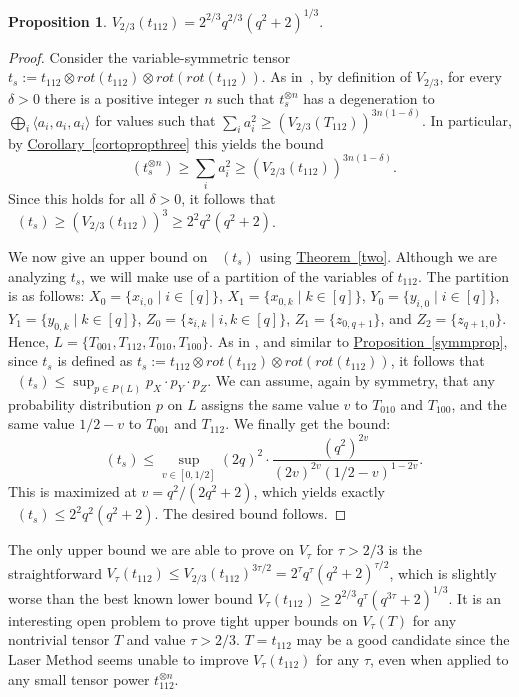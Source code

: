 \documentclass[11pt]{article}
\numberwithin{equation}{section}
\newtheorem{proposition}[theorem]{Proposition}
\theoremstyle{definition}
\theoremstyle{plain}
\newcommand{\expref}[2]{\hyperref[#2]{#1~\ref{#2}}}
\newcommand{\tsr}{\mathop{\tilde{\operatorname{S}}}}
\theoremstyle{definition}
\begin{document}
\begin{proposition} \label{valueprop}
$V_{2/3}(t_{112}) = 2^{2/3} q^{2/3} (q^{2} + 2)^{1/3}.$
\end{proposition}

\begin{proof}
Consider the variable-symmetric tensor $t_s := t_{112} \otimes rot(t_{112}) \otimes rot(rot(t_{112}))$.
As in~\cite{coppersmith}, by definition of $V_{2/3}$, for every $\delta>0$ there is a positive integer $n$ such that $t_s^{\otimes n}$ has a degeneration to $\bigoplus_i \langle a_i, a_i, a_i \rangle$ for values such that $\sum_i a_i^2 \geq (V_{2/3}(T_{112}))^{3n(1-\delta)}$. In particular, by \expref{Corollary}{cortopropthree} this yields the bound $$\tsr(t_s^{\otimes n}) \geq \sum_i a_i^2 \geq (V_{2/3}(t_{112}))^{3n(1-\delta)}.$$ Since this holds for all $\delta>0$, it follows that $\tsr(t_s)  \geq (V_{2/3}(t_{112}))^3 \geq 2^{2} q^{2} (q^{2} + 2)$.

We now %
give an upper bound on %
$\tsr(t_s)$ using \expref{Theorem}{two}. Although we are analyzing $t_s$, we will make use of a partition of the variables of $t_{112}$. The partition is as follows: $X_0 = \{ x_{i,0} \mid i \in [q] \}$, $X_1 = \{ x_{0,k} \mid k \in [q] \}$, $Y_0 = \{ y_{i,0} \mid i \in [q] \}$, $Y_1 = \{ y_{0,k} \mid k \in [q] \}$, $Z_0 = \{ z_{i,k} \mid i,k \in [q] \}$, $Z_1 = \{ z_{0,q+1} \}$, and $Z_2 = \{ z_{q+1,0} \}$. Hence, $L = \{ T_{001}, T_{112}, T_{010}, T_{100} \}$. As in \cite{coppersmith}, and similar to \expref{Proposition}{symmprop}, since $t_s$ is defined as $t_s := t_{112} \otimes rot(t_{112}) \otimes rot(rot(t_{112}))$, it follows that $\tsr(t_s) \leq \sup_{p \in P(L)} p_X \cdot p_Y \cdot p_Z$.
We can assume, again by symmetry, that any probability distribution $p$ on $L$ assigns the same value $v$ to $T_{010}$ and $T_{100}$, and the same value $1/2 - v$ to $T_{001}$ and $T_{112}$. We finally get the bound:
\[
  \tsr(t_s) \leq \sup_{v \in [0,1/2]} \left( 2q \right)^2 \cdot \frac{(q^2)^{2v}}{(2v)^{2v} (1/2-v)^{1-2v}}.
\]
This is maximized at $v = q^2 / (2q^2+2)$, which yields exactly $\tsr(t_s) \leq 2^{2} q^{2} (q^{2} + 2)$. The desired bound follows.
\end{proof}

The only upper bound we are able to prove on $V_{\tau}$ for $\tau>2/3$ is the straightforward $V_\tau(t_{112}) \leq V_{2/3}(t_{112})^{3 \tau/2} = 2^{\tau} q^{\tau} (q^{2} + 2)^{\tau/2}$, which is slightly worse than the best known lower bound $V_\tau(t_{112}) \geq 2^{2/3} q^\tau (q^{3\tau} + 2)^{1/3}$. It is an interesting open problem to prove tight upper bounds on $V_\tau(T)$ for any nontrivial tensor $T$ and value $\tau>2/3$. $T = t_{112}$ may be a good candidate since the Laser Method seems unable to improve $V_\tau(t_{112})$ for any $\tau$, even when applied to any small tensor power $t_{112}^{\otimes n}$.
\end{document}
